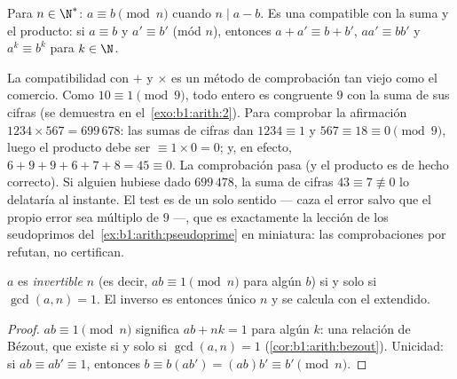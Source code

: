 \begin{definition}\label{def:b1:arith:congruence}
Para $n \in \N^*$: $a \equiv b \pmod n$ cuando
$n \mid a - b$. Es una  compatible con la
suma y el producto: si $a \equiv b$ y $a' \equiv b'$ (mód $n$),
entonces $a + a' \equiv b + b'$, $aa' \equiv bb'$ y $a^k \equiv b^k$
para $k \in \N$.
\end{definition}

\begin{example}\label{ex:b1:arith:castingnines}
La compatibilidad con $+$ y $\times$ es un método de comprobación tan
viejo como el comercio. Como $10 \equiv 1 \pmod 9$, todo entero es
congruente  $9$ con la suma de sus cifras (se demuestra en
el~\cref{exo:b1:arith:2}). Para comprobar la afirmación
$1234 \times 567 = 699\,678$: las sumas de cifras dan $1234 \equiv 1$
y $567 \equiv 18 \equiv 0 \pmod 9$, luego el producto debe ser
$\equiv 1 \times 0 = 0$; y, en efecto, $6 + 9 + 9 + 6 + 7 + 8 = 45
\equiv 0$. La comprobación pasa (y el producto es de hecho correcto).
Si alguien hubiese dado $699\,478$, la suma de cifras $43 \equiv 7
\not\equiv 0$ lo delataría al instante. El test es de un solo sentido
--- caza el error salvo que el propio error sea múltiplo de $9$ ---,
que es exactamente la lección de los seudoprimos
del~\cref{ex:b1:arith:pseudoprime} en miniatura: las comprobaciones
por  refutan, no certifican.
\end{example}

\begin{proposition}\label{prop:b1:arith:invmod}
$a$ es \emph{invertible  $n$} (es decir, $ab \equiv 1 \pmod n$
para algún $b$) si y solo si $\gcd(a, n) = 1$. El inverso es entonces
único  $n$ y se calcula con el  extendido.
\end{proposition}

\begin{proof}
$ab \equiv 1 \pmod n$ significa $ab + nk = 1$ para algún $k$: una
relación de Bézout, que existe si y solo si $\gcd(a,n) = 1$
(\cref{cor:b1:arith:bezout}). Unicidad: si $ab \equiv ab' \equiv 1$,
entonces $b \equiv b(ab') = (ab)b' \equiv b' \pmod n$.
\end{proof}

